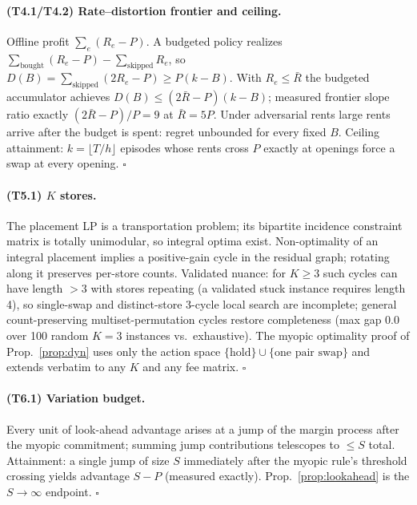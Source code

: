\documentclass[10pt,twocolumn]{article}
\theoremstyle{definition}
\begin{document}
\paragraph{(T4.1/T4.2) Rate--distortion frontier and ceiling.}
Offline profit $\sum_e(R_e-P)$. A budgeted policy realizes
$\sum_{\text{bought}}(R_e-P)-\sum_{\text{skipped}}R_e$, so
$D(B)=\sum_{\text{skipped}}(2R_e-P)\ge P(k-B)$. With $R_e\le\bar R$ the budgeted accumulator
achieves $D(B)\le(2\bar R-P)(k-B)$; measured frontier slope ratio exactly
$(2\bar R-P)/P=9$ at $\bar R=5P$. Under adversarial rents large rents arrive after the
budget is spent: regret unbounded for every fixed $B$. Ceiling attainment: $k=\lfloor
T/h\rfloor$ episodes whose rents cross $P$ exactly at openings force a swap at every
opening. \hfill$\square$

\paragraph{(T5.1) $K$ stores.}
The placement LP is a transportation problem; its bipartite incidence constraint matrix is
totally unimodular, so integral optima exist. Non-optimality of an integral placement
implies a positive-gain cycle in the residual graph; rotating along it preserves per-store
counts. Validated nuance: for $K\ge3$ such cycles can have length $>3$ with stores repeating
(a validated stuck instance requires length 4), so single-swap and distinct-store 3-cycle
local search are incomplete; general count-preserving multiset-permutation cycles restore
completeness (max gap $0.0$ over 100 random $K{=}3$ instances vs.\ exhaustive). The myopic
optimality proof of Prop.~\ref{prop:dyn} uses only the action space
$\{\text{hold}\}\cup\{\text{one pair swap}\}$ and extends verbatim to any $K$ and any fee
matrix. \hfill$\square$

\paragraph{(T6.1) Variation budget.}
Every unit of look-ahead advantage arises at a jump of the margin process after the myopic
commitment; summing jump contributions telescopes to $\le S$ total. Attainment: a single
jump of size $S$ immediately after the myopic rule's threshold crossing yields advantage
$S-P$ (measured exactly). Prop.~\ref{prop:lookahead} is the $S\to\infty$ endpoint.
\hfill$\square$
\end{document}
